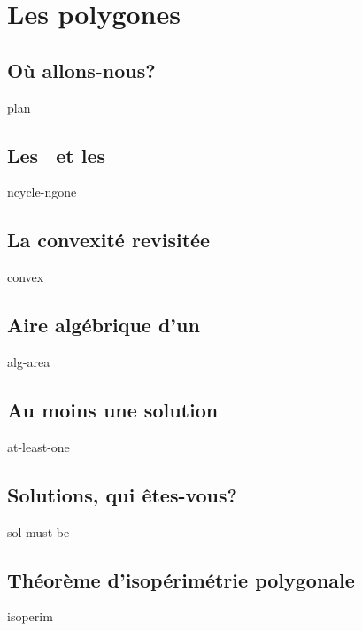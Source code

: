 \documentclass[12pt]{amsart}
\newcommand{\ncycle}{\xcycle{n}}
\newcommand{\ncycles}{\xcycles{n}}
\newcommand{\ngones}{\xgones{n}}
\begin{document}
\section{Les polygones}

\subsection{Où allons-nous?}
{plan}


\subsection{Les \ncycles\ et les \ngones}
{ncycle-ngone}



\subsection{La convexité revisitée}
{convex}


\subsection{Aire algébrique d'un \ncycle}
{alg-area}


\subsection{Au moins une solution}
{at-least-one}


\subsection{Solutions, qui êtes-vous?}
{sol-must-be}


\subsection{Théorème d'isopérimétrie polygonale}
{isoperim}
\end{document}

